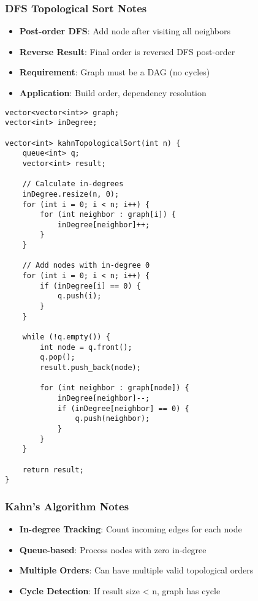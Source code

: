 \documentclass[11pt,a4paper]{article}
\begin{document}
\subsubsection*{DFS Topological Sort Notes}
\begin{itemize}
\item \textbf{Post-order DFS}: Add node after visiting all neighbors
\item \textbf{Reverse Result}: Final order is reversed DFS post-order
\item \textbf{Requirement}: Graph must be a DAG (no cycles)
\item \textbf{Application}: Build order, dependency resolution
\end{itemize}

\newpage
\begin{lstlisting}[caption={Topological Sort with Kahn's Algorithm}]
vector<vector<int>> graph;
vector<int> inDegree;

vector<int> kahnTopologicalSort(int n) {
    queue<int> q;
    vector<int> result;
    
    // Calculate in-degrees
    inDegree.resize(n, 0);
    for (int i = 0; i < n; i++) {
        for (int neighbor : graph[i]) {
            inDegree[neighbor]++;
        }
    }
    
    // Add nodes with in-degree 0
    for (int i = 0; i < n; i++) {
        if (inDegree[i] == 0) {
            q.push(i);
        }
    }
    
    while (!q.empty()) {
        int node = q.front();
        q.pop();
        result.push_back(node);
        
        for (int neighbor : graph[node]) {
            inDegree[neighbor]--;
            if (inDegree[neighbor] == 0) {
                q.push(neighbor);
            }
        }
    }
    
    return result;
}
\end{lstlisting}

\subsubsection*{Kahn's Algorithm Notes}
\begin{itemize}
\item \textbf{In-degree Tracking}: Count incoming edges for each node
\item \textbf{Queue-based}: Process nodes with zero in-degree
\item \textbf{Multiple Orders}: Can have multiple valid topological orders
\item \textbf{Cycle Detection}: If result size < n, graph has cycle
\end{itemize}
\end{document}
